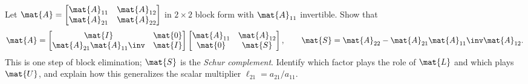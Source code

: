 \begin{exercise}
\label{ch09:ex-block}
Let $\mat{A}=\begin{bmatrix} \mat{A}_{11} & \mat{A}_{12} \\ \mat{A}_{21} & \mat{A}_{22}
\end{bmatrix}$ in $2\times 2$ block form with $\mat{A}_{11}$ invertible. Show that
\[
  \mat{A} = \begin{bmatrix} \mat{I} & \mat{0} \\ \mat{A}_{21}\mat{A}_{11}\inv & \mat{I} \end{bmatrix}
            \begin{bmatrix} \mat{A}_{11} & \mat{A}_{12} \\ \mat{0} & \mat{S} \end{bmatrix},
  \qquad \mat{S} = \mat{A}_{22} - \mat{A}_{21}\mat{A}_{11}\inv\mat{A}_{12}.
\]
This is one step of block elimination; $\mat{S}$ is the \emph{Schur complement}. Identify
which factor plays the role of $\mat{L}$ and which plays $\mat{U}$, and explain how this
generalizes the scalar multiplier $\ell_{21}=a_{21}/a_{11}$.
\end{exercise}
